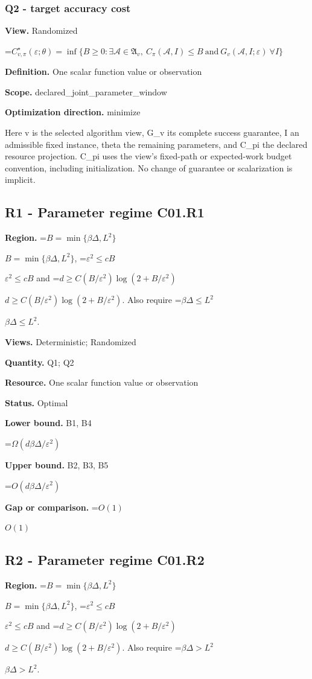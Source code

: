 \documentclass[10pt,a4paper]{article}
\newcommand{\AtlasMath}[1]{\par\begingroup\centering\setbox0=\hbox{$\displaystyle #1$}\ifdim\wd0>1.4\linewidth\typeout{ATLAS WIDE FORMULA: \the\wd0}\fi\ifdim\wd0>\linewidth\resizebox{\linewidth}{!}{\box0}\else\box0\fi\par\endgroup}
\newcommand{\AtlasInlineMath}[1]{\begingroup\setbox0=\hbox{$#1$}\ifdim\wd0>.4\linewidth\endgroup\AtlasMath{#1}\else\endgroup$#1$\fi}
\begin{document}
\subsubsection{Q2 - target accuracy cost}
\textbf{View.} Randomized

\AtlasMath{C^\star_{v,\pi}(\varepsilon;\theta)=\inf\{B\ge0:\exists\mathcal A\in\mathfrak A_v,\ C_\pi(\mathcal A,I)\le B\ \text{and}\ G_v(\mathcal A,I;\varepsilon)\ \forall I\}}
\textbf{Definition.} One scalar function value or observation

\textbf{Scope.} declared\_joint\_parameter\_window

\textbf{Optimization direction.} minimize

Here v is the selected algorithm view, G\_v its complete success guarantee, I an admissible fixed instance, theta the remaining parameters, and C\_pi the declared resource projection. C\_pi uses the view's fixed-path or expected-work budget convention, including initialization. No change of guarantee or scalarization is implicit.

\subsection{R1 - Parameter regime C01.R1}
\textbf{Region.} \AtlasInlineMath{B=\min\{\beta\Delta,L^2\}}, \AtlasInlineMath{\varepsilon^2\le cB} and \AtlasInlineMath{d\ge C(B/\varepsilon^2)\log(2+B/\varepsilon^2)}. Also require \AtlasInlineMath{\beta\Delta\le L^2}.

\textbf{Views.} Deterministic; Randomized

\textbf{Quantity.} Q1; Q2

\textbf{Resource.} One scalar function value or observation

\textbf{Status.} Optimal

\textbf{Lower bound.} B1, B4

\AtlasMath{\Omega(d\beta\Delta/\varepsilon^2)}
\textbf{Upper bound.} B2, B3, B5

\AtlasMath{O(d\beta\Delta/\varepsilon^2)}
\textbf{Gap or comparison.} \AtlasInlineMath{O(1)}

\subsection{R2 - Parameter regime C01.R2}
\textbf{Region.} \AtlasInlineMath{B=\min\{\beta\Delta,L^2\}}, \AtlasInlineMath{\varepsilon^2\le cB} and \AtlasInlineMath{d\ge C(B/\varepsilon^2)\log(2+B/\varepsilon^2)}. Also require \AtlasInlineMath{\beta\Delta>L^2}.
\end{document}
